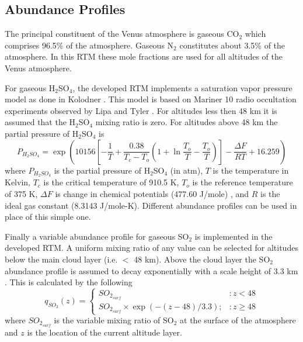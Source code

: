 \subsection{Abundance Profiles}
The principal constituent of the Venus atmosphere is gaseous CO$_2$ which comprises 96.5\% of the atmosphere. Gaseous N$_2$ constitutes about 3.5\% of the atmosphere. In this RTM these mole fractions are used for all altitudes of the Venus atmosphere. 

For gaseous H$_2$SO$_4$, the developed RTM implements a saturation vapor pressure model as done in Kolodner \cite{Kolodner-thesis}. This model is based on Mariner 10 radio occultation experiments observed by Lipa and Tyler \cite{Lipa-1979}. For altitudes less then 48 km it is assumed that the H$_2$SO$_4$ mixing ratio is zero. For altitudes above 48 km the partial pressure of H$_2$SO$_4$ is
\begin{equation}
P_{H_2SO_4} = \exp\left(10156\left[ -\frac{1}{T}+ \frac{0.38}{T_c-T_o}\left(1+\ln\frac{T_o}{T} - \frac{T_o}{T}\right) \right] - \frac{\Delta F}{R T} + 16.259 \right)
\end{equation}
where $P_{H_2SO_4}$ is the partial pressure of H$_2$SO$_4$ (in atm), $T$ is the temperature in Kelvin, $T_c$ is the critical temperature of 910.5 K, $T_o$ is the reference temperature of 375 K, $\Delta F$ is change in chemical potentials (477.60 J/mole) \cite{Giauque-1960}, and $R$ is the ideal gas constant (8.3143 J/mole-K). Different abundance profiles can be used in place of this simple one. %

Finally a variable abundance profile for gaseous SO$_2$ is implemented in the developed RTM. A uniform mixing ratio of any value can be selected for altitudes below the main cloud layer (i.e. $<$ 48 km). Above the cloud layer the SO$_2$ abundance profile is assumed to decay exponentially with a scale height of 3.3 km \cite{Na-1994}. This is calculated by the following
\begin{equation}
q_{SO_2}(z) = \left\{
     \begin{array}{lr}
       SO_{2_{surf}} & : z < 48\\
       SO_{2_{surf}}\times\exp(-(z-48)/3.3); & : z\geq 48
     \end{array}
   \right.
\end{equation}
where $SO_{2_{surf}}$ is the variable mixing ratio of SO$_2$ at the surface of the atmosphere and $z$ is the location of the current altitude layer.


